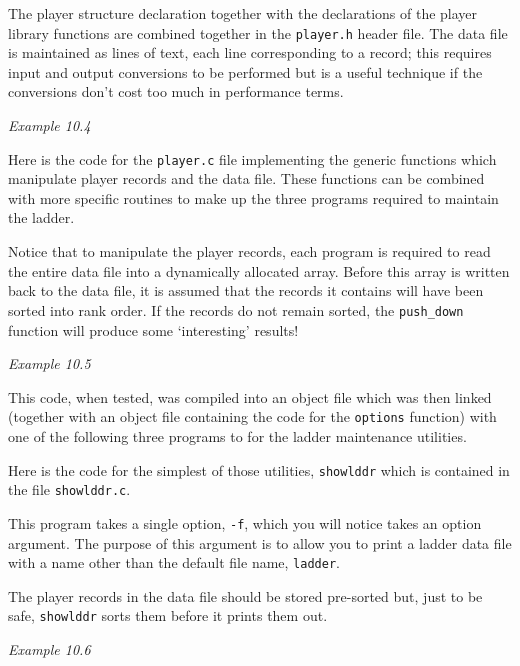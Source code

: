   The player structure declaration together with the declarations of the
   player library functions are combined together in the \texttt{player.h}
   header file. The data file is maintained as lines of text, each line
   corresponding to a record; this requires input and output conversions to be
   performed but is a useful technique if the conversions don't cost too much
   in performance terms.


  \begin{center}\textit{Example 10.4}\end{center}


  Here is the code for the \texttt{player.c} file implementing the
   generic functions which manipulate player records and the data file. These
   functions can be combined with more specific routines to make up the three
   programs required to maintain the ladder.


  Notice that to manipulate the player records, each program is required to
   read the entire data file into a dynamically allocated array. Before this
   array is written back to the data file, it is assumed that the records it
   contains will have been sorted into rank order. If the records do not remain
   sorted, the \texttt{push\_down} function will produce some
   `interesting' results!


  \begin{center}\textit{Example 10.5}\end{center}


  This code, when tested, was compiled into an object file which was then
   linked (together with an object file containing the code for the
   \texttt{options} function) with one of the following three programs to
   for the ladder maintenance utilities.


  Here is the code for the simplest of those utilities,
   \texttt{showlddr} which is contained in the file
   \texttt{showlddr.c}.


  This program takes a single option, \texttt{-f}, which you will notice
   takes an option argument. The purpose of this argument is to allow you to
   print a ladder data file with a name other than the default file name,
   \texttt{ladder}.


  The player records in the data file should be stored pre-sorted but, just
   to be safe, \texttt{showlddr} sorts them before it prints them out.


  \begin{center}\textit{Example 10.6}\end{center}


